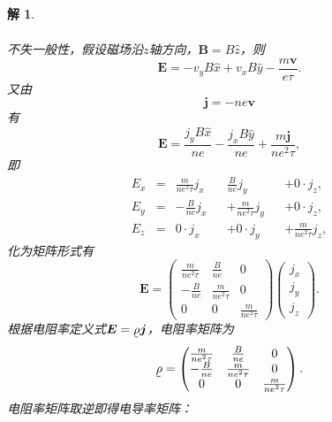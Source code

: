 \documentclass[UTF8,10pt,a4paper]{article}
\theoremstyle{Problem}
\theoremstyle{Solution}
\newtheorem*{sol}{解}
\begin{document}
\begin{sol}
\begin{enumerate}
\begin{gather}
        \end{gather}
        不失一般性，假设磁场沿$z$轴方向，$\bm{B}=B\hat{z}$，则
        \begin{equation}
            \bm{E}=-v_yB\hat{x}+v_xB\hat{y}-\frac{m\bm{v}}{e\tau}.
        \end{equation}
        又由
        \begin{equation}
            \bm{j}=-ne\bm{v}
        \end{equation}
        有
        \begin{equation}
            \bm{E}=\frac{j_yB\hat{x}}{ne}-\frac{j_xB\hat{y}}{ne}+\frac{m\bm{j}}{ne^2\tau},
        \end{equation}
        即
        \begin{align}
            E_x&=&\frac{m}{ne^2\tau}j_x&&\frac{B}{ne}j_y&&+0\cdot j_z,\\
            E_y&=&-\frac{B}{ne}j_x&&+\frac{m}{ne^2\tau}j_y&&+0\cdot j_z,\\
            E_z&=&0\cdot j_x&&+0\cdot j_y&&+\frac{m}{ne^2\tau}j_z,
        \end{align}
        化为矩阵形式有
        \begin{equation}
            \bm{E}=\left(\begin{matrix}
                \frac{m}{ne^2\tau}&\frac{B}{ne}&0\\
                -\frac{B}{ne}&\frac{m}{ne^2\tau}&0\\
                0&0&\frac{m}{ne^2\tau}
            \end{matrix}\right)\left(\begin{matrix}
                j_x\\
                j_y\\
                j_z
            \end{matrix}\right).
        \end{equation}
        根据电阻率定义式$\bm{E}=\underaccent{\tilde}{\rho}\bm{j}$，电阻率矩阵为
        \begin{equation}
            \underaccent{\tilde}{\rho}=\left(\begin{matrix}
                \frac{m}{ne^2\tau}&\frac{B}{ne}&0\\
                -\frac{B}{ne}&\frac{m}{ne^2\tau}&0\\
                0&0&\frac{m}{ne^2\tau}
            \end{matrix}\right).
        \end{equation}
        电阻率矩阵取逆即得电导率矩阵：
        \begin{equation}

\end{equation}
\end{enumerate}
\end{sol}
\end{document}
